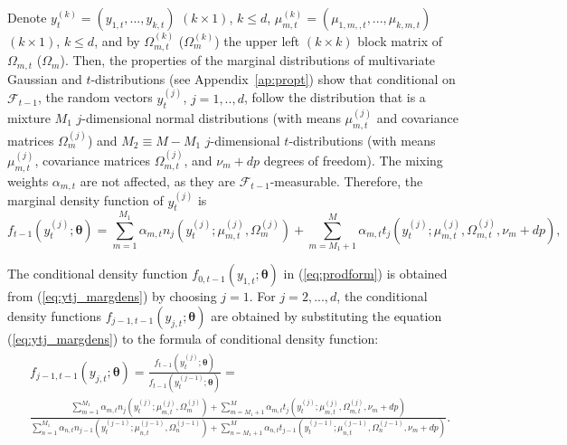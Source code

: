 \documentclass[nojss]{jss} %
\begin{document}
\begin{appendix}
Denote $y_t^{(k)}=(y_{1,t},...,y_{k,t})$ $(k\times 1)$,  $k\leq d$,   $\mu_{m,t}^{(k)}=(\mu_{1,m,,t},...,\mu_{k,m,t})$ $(k\times 1)$,  $k\leq d$,  and by $\Omega_{m,t}^{(k)}$ ($\Omega_{m}^{(k)}$) the upper left $(k\times k)$ block matrix of $\Omega_{m,t}$ ($\Omega_{m}$).  Then,  the properties of the marginal distributions of multivariate Gaussian and $t$-distributions (see Appendix~\ref{ap:propt}) show that conditional on $\mathcal{F}_{t-1}$,  the random vectors $y_t^{(j)}$, $j=1,..,d$,  follow the distribution that is a mixture $M_1$ $j$-dimensional normal distributions (with means $\mu_{m,t}^{(j)}$ and covariance matrices $\Omega_{m}^{(j)}$) and $M_2\equiv M-M_1$ $j$-dimensional $t$-distributions (with means $\mu_{m,t}^{(j)}$,  covariance matrices $\Omega_{m,t}^{(j)}$, and $\nu_m + dp$ degrees of freedom).  The mixing weights $\alpha_{m,t}$ are not affected, as they are $\mathcal{F}_{t-1}$-measurable.  Therefore, the marginal density function of $y_t^{(j)}$ is
\begin{equation}\label{eq:ytj_margdens}
f_{t-1}(y_{t}^{(j)};\boldsymbol{\theta})=\sum_{m=1}^{M_1}\alpha_{m,t} n_j(y_{t}^{(j)};\mu_{m,t}^{(j)},\Omega_{m}^{(j)}) + \sum_{m=M_1 + 1}^{M}\alpha_{m,t} t_j(y_{t}^{(j)};\mu_{m,t}^{(j)},\Omega_{m,t}^{(j)},\nu_m + dp),
\end{equation}

The conditional density function $f_{0,t-1}(y_{1,t};\boldsymbol{\theta})$ in (\ref{eq:prodform}) is obtained from (\ref{eq:ytj_margdens}) by choosing $j=1$.  For $j=2,...,d$,  the conditional density functions  $f_{j-1,t-1}(y_{j,t};\boldsymbol{\theta})$ are obtained by substituting the equation (\ref{eq:ytj_margdens}) to the formula of conditional density function:
\begin{align}\label{eq:conddens_gstmvar}
\begin{aligned}
&f_{j-1,t-1}\left(y_{j,t};\boldsymbol{\theta}\right) = \frac{f_{t-1}(y_{t}^{(j)};\boldsymbol{\theta})}{f_{t-1}(y_{t}^{(j-1)};\boldsymbol{\theta})} = \\
&\frac{\sum_{m=1}^{M_1}\alpha_{m,t} n_j(y_{t}^{(j)};\mu_{m,t}^{(j)},\Omega_{m}^{(j)}) + \sum_{m=M_1+1}^{M}\alpha_{m,t} t_j(y_{t}^{(j)};\mu_{m,t}^{(j)},\Omega_{m,t}^{(j)}, \nu_m+dp)}{\sum_{n=1}^{M_1}\alpha_{n,t} n_{j-1}(y_{t}^{(j-1)};\mu_{n,t}^{(j-1)},\Omega_n^{(j-1)}) + \sum_{n=M_1+1}^{M}\alpha_{n,t} t_{j-1}(y_{t}^{(j-1)};\mu_{n,t}^{(j-1)},\Omega_n^{(j-1)},\nu_m + dp)}.
\end{aligned}
\end{align}


\end{appendix}
\end{document}
